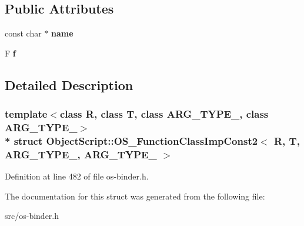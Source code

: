 \subsection*{Public Attributes}
\begin{DoxyCompactItemize}
\item 
const char $\ast$ {\bfseries name}\hypertarget{struct_object_script_1_1_o_s___function_class_imp_const2_ae425be5a3a70468e6b50734b0f3a6f47}{}\label{struct_object_script_1_1_o_s___function_class_imp_const2_ae425be5a3a70468e6b50734b0f3a6f47}

\item 
F {\bfseries f}\hypertarget{struct_object_script_1_1_o_s___function_class_imp_const2_a732c3efc7b0c5f622d29608f56efc6db}{}\label{struct_object_script_1_1_o_s___function_class_imp_const2_a732c3efc7b0c5f622d29608f56efc6db}

\end{DoxyCompactItemize}


\subsection{Detailed Description}
\subsubsection*{template$<$class R, class T, class A\+R\+G\+\_\+\+T\+Y\+P\+E\+\_, class A\+R\+G\+\_\+\+T\+Y\+P\+E\+\_$>$\\*
struct Object\+Script\+::\+O\+S\+\_\+\+Function\+Class\+Imp\+Const2$<$ R, T, A\+R\+G\+\_\+\+T\+Y\+P\+E\+\_, A\+R\+G\+\_\+\+T\+Y\+P\+E\+\_ $>$}



Definition at line 482 of file os-\/binder.\+h.



The documentation for this struct was generated from the following file\+:\begin{DoxyCompactItemize}
\item 
src/os-\/binder.\+h\end{DoxyCompactItemize}
